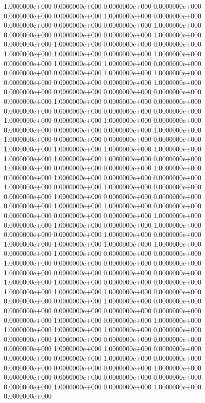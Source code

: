   1.0000000e+000  0.0000000e+000  0.0000000e+000  0.0000000e+000  0.0000000e+000
  0.0000000e+000  1.0000000e+000  0.0000000e+000  0.0000000e+000  0.0000000e+000
  0.0000000e+000  1.0000000e+000  0.0000000e+000  0.0000000e+000  0.0000000e+000
  1.0000000e+000  0.0000000e+000  1.0000000e+000  0.0000000e+000  0.0000000e+000
  1.0000000e+000  1.0000000e+000  0.0000000e+000  1.0000000e+000  0.0000000e+000
  1.0000000e+000  1.0000000e+000  0.0000000e+000  0.0000000e+000  0.0000000e+000
  1.0000000e+000  1.0000000e+000  0.0000000e+000  0.0000000e+000  0.0000000e+000
  1.0000000e+000  0.0000000e+000  0.0000000e+000  0.0000000e+000  0.0000000e+000
  0.0000000e+000  1.0000000e+000  0.0000000e+000  0.0000000e+000  0.0000000e+000
  0.0000000e+000  0.0000000e+000  0.0000000e+000  1.0000000e+000  0.0000000e+000
  1.0000000e+000  0.0000000e+000  0.0000000e+000  0.0000000e+000  0.0000000e+000
  1.0000000e+000  1.0000000e+000  0.0000000e+000  0.0000000e+000  0.0000000e+000
  1.0000000e+000  1.0000000e+000  1.0000000e+000  1.0000000e+000  1.0000000e+000
  1.0000000e+000  1.0000000e+000  0.0000000e+000  1.0000000e+000  0.0000000e+000
  0.0000000e+000  1.0000000e+000  0.0000000e+000  1.0000000e+000  0.0000000e+000
  0.0000000e+000  1.0000000e+000  0.0000000e+000  1.0000000e+000  0.0000000e+000
  0.0000000e+000  1.0000000e+000  0.0000000e+000  0.0000000e+000  0.0000000e+000
  1.0000000e+000  1.0000000e+000  0.0000000e+000  0.0000000e+000  0.0000000e+000
  0.0000000e+000  1.0000000e+000  0.0000000e+000  1.0000000e+000  0.0000000e+000
  1.0000000e+000  0.0000000e+000  0.0000000e+000  1.0000000e+000  0.0000000e+000
  1.0000000e+000  1.0000000e+000  1.0000000e+000  1.0000000e+000  0.0000000e+000
  1.0000000e+000  0.0000000e+000  0.0000000e+000  1.0000000e+000  0.0000000e+000
  0.0000000e+000  0.0000000e+000  1.0000000e+000  0.0000000e+000  0.0000000e+000
  0.0000000e+000  1.0000000e+000  1.0000000e+000  0.0000000e+000  0.0000000e+000
  1.0000000e+000  1.0000000e+000  1.0000000e+000  0.0000000e+000  0.0000000e+000
  0.0000000e+000  1.0000000e+000  0.0000000e+000  0.0000000e+000  0.0000000e+000
  0.0000000e+000  0.0000000e+000  0.0000000e+000  1.0000000e+000  0.0000000e+000
  1.0000000e+000  1.0000000e+000  1.0000000e+000  1.0000000e+000  0.0000000e+000
  0.0000000e+000  1.0000000e+000  0.0000000e+000  0.0000000e+000  0.0000000e+000
  1.0000000e+000  1.0000000e+000  0.0000000e+000  0.0000000e+000  0.0000000e+000
  1.0000000e+000  0.0000000e+000  0.0000000e+000  0.0000000e+000  0.0000000e+000
  1.0000000e+000  0.0000000e+000  0.0000000e+000  0.0000000e+000  0.0000000e+000
  0.0000000e+000  1.0000000e+000  0.0000000e+000  1.0000000e+000  0.0000000e+000
